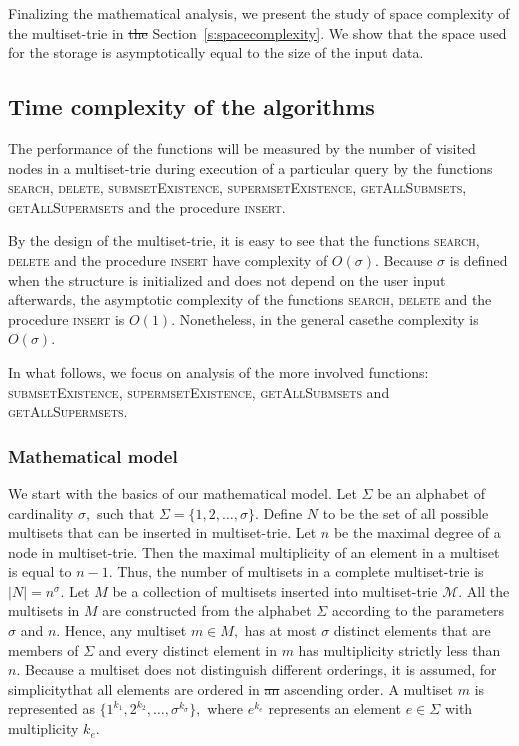 \documentclass[10pt,letterpaper]{article}
\providecommand{\DIFaddtex}[1]{{\protect\color{blue}\uwave{#1}}} %
\providecommand{\DIFdeltex}[1]{{\protect\color{red}\sout{#1}}}                      %
\providecommand{\DIFaddbegin}{} %
\providecommand{\DIFaddend}{} %
\providecommand{\DIFdelbegin}{} %
\providecommand{\DIFdelend}{} %
\providecommand{\DIFadd}[1]{\texorpdfstring{\DIFaddtex{#1}}{#1}} %
\providecommand{\DIFdel}[1]{\texorpdfstring{\DIFdeltex{#1}}{}} %
\newcommand{\DIFscaledelfig}{0.5}
\newlength{\DIFdelgraphicswidth} %
\newlength{\DIFdelgraphicsheight} %
\newcommand{\DIFaddincludegraphics}[2][]{{\color{blue}\fbox{\DIFOincludegraphics[#1]{#2}}}} %
\newcommand{\DIFdelincludegraphics}[2][]{%
\sbox{\DIFdelgraphicsbox}{\DIFOincludegraphics[#1]{#2}}%
\settoboxwidth{\DIFdelgraphicswidth}{\DIFdelgraphicsbox} %
\settoboxtotalheight{\DIFdelgraphicsheight}{\DIFdelgraphicsbox} %
\scalebox{\DIFscaledelfig}{%
\parbox[b]{\DIFdelgraphicswidth}{\usebox{\DIFdelgraphicsbox}\\[-\baselineskip] \rule{\DIFdelgraphicswidth}{0em}}\llap{\resizebox{\DIFdelgraphicswidth}{\DIFdelgraphicsheight}{%
\setlength{\unitlength}{\DIFdelgraphicswidth}%
\begin{picture}(1,1)%
\thicklines\linethickness{2pt} %
{\color[rgb]{1,0,0}\put(0,0){\framebox(1,1){}}}%
{\color[rgb]{1,0,0}\put(0,0){\line( 1,1){1}}}%
{\color[rgb]{1,0,0}\put(0,1){\line(1,-1){1}}}%
\end{picture}%
}\hspace*{3pt}}} %
} %
\DeclareRobustCommand{\DIFaddbegin}{\DIFOaddbegin \let\includegraphics\DIFaddincludegraphics} %
\DeclareRobustCommand{\DIFaddend}{\DIFOaddend \let\includegraphics\DIFOincludegraphics} %
\DeclareRobustCommand{\DIFdelbegin}{\DIFOdelbegin \let\includegraphics\DIFdelincludegraphics} %
\DeclareRobustCommand{\DIFdelend}{\DIFOaddend \let\includegraphics\DIFOincludegraphics} %
\begin{document}
Finalizing the mathematical analysis, we present the study of space complexity 
of the multiset-trie in \DIFdelbegin \DIFdel{the }\DIFdelend Section~\ref{s:spacecomplexity}. We show that the space 
used for the storage is asymptotically equal to the size of the input data. 

\subsection{Time complexity of the algorithms}\label{s:timecomplexity}
The performance of the functions will be measured by the number of 
visited nodes in a multiset-trie during \DIFaddbegin \DIFadd{the }\DIFaddend execution of a particular query by the 
functions \textsc{search}, \textsc{delete}, \textsc{submsetExistence}, 
\textsc{supermsetExistence}, \textsc{getAllSubmsets}, \textsc{getAllSupermsets} 
and the procedure \textsc{insert}.
%

By the design of the multiset-trie, it is easy to see that the functions \textsc{search},
\textsc{delete} and the procedure \textsc{insert} have complexity of $O(\sigma).$
Because $\sigma$ is defined when the structure is initialized and does not depend
on the user input afterwards, the asymptotic complexity of the functions \textsc{search}, 
\textsc{delete} and the procedure \textsc{insert} is $O(1).$ Nonetheless, in the general 
case\DIFaddbegin \DIFadd{, }\DIFaddend the complexity is $O(\sigma).$

In what follows, we focus on \DIFaddbegin \DIFadd{the }\DIFaddend analysis of the more involved functions:
\textsc{submsetExistence}, \textsc{supermsetExistence}, \textsc{getAllSubmsets}
and \textsc{getAllSupermsets}.

\subsubsection{Mathematical model} \label{ss:mathmodel}
We start with the basics of our mathematical model. Let $\Sigma$ be an alphabet of
cardinality $\sigma,$ such that $\Sigma = \{ 1,2, \ldots, \sigma \}.$ Define $N$
to be the set of all possible multisets that can be inserted in \DIFaddbegin \DIFadd{a
}\DIFaddend multiset-trie. Let $n$ be the maximal degree of a node in \DIFaddbegin \DIFadd{a }\DIFaddend multiset-trie.
Then the maximal multiplicity of an element in a multiset is equal to $n-1.$
Thus, the number of multisets in a complete multiset-trie is $ |N| = n^{\sigma}.$
%
Let $M$ be a collection of multisets inserted into multiset-trie $\mathcal{M}.$
All the multisets in $M$ are constructed from the alphabet $\Sigma$ according
to the parameters $\sigma$ and $n$. Hence, any multiset $m\in M,$ 
has at most $\sigma$ distinct elements that are members of $\Sigma$ and 
every distinct element in $m$ has multiplicity strictly less than $n.$
%
Because a multiset does not distinguish different orderings, it is assumed, for
simplicity\DIFaddbegin \DIFadd{, }\DIFaddend that all elements are ordered in \DIFdelbegin \DIFdel{an }\DIFdelend ascending order. A multiset $m$ is
represented as $\{1^{k_1},2^{k_2},\ldots, \sigma^{k_\sigma}\},$ where $e^{k_e}$
represents an element $e\in\Sigma$ with multiplicity $k_e.$
%
\end{document}
